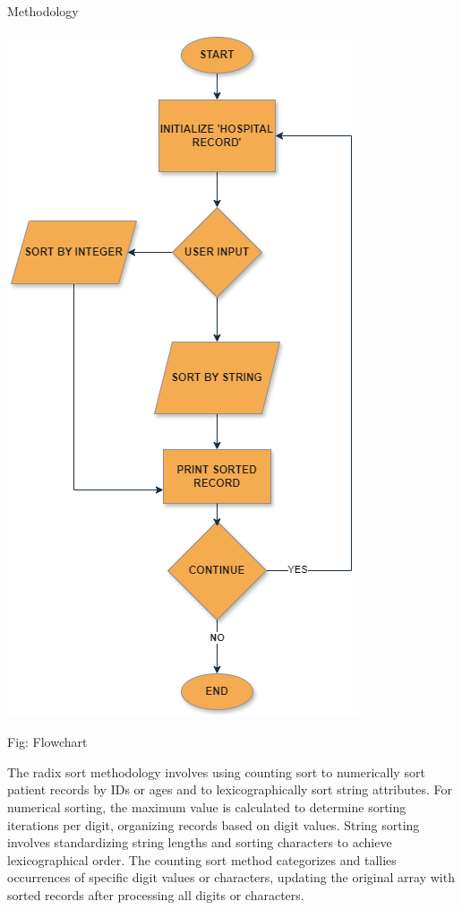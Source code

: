 \documentclass[final]{beamer}
\newlength{\colwidth}
\begin{document}
\begin{frame}[t]
\begin{columns}[t]
\begin{column}{\colwidth}
			\begin{alertblock}{Methodology}
   \begin{center}
       \includegraphics[]{Flow chart/CSE211 Project Hospital Record (radix sort) - flowchart.png}
       \addlinespace
       \caption{Fig: Flowchart }
   \end{center}
   The radix sort methodology involves using counting sort to numerically sort patient records by IDs or ages and to lexicographically sort string attributes. For numerical sorting, the maximum value is calculated to determine sorting iterations per digit, organizing records based on digit values. String sorting involves standardizing string lengths and sorting characters to achieve lexicographical order. The counting sort method categorizes and tallies occurrences of specific digit values or characters, updating the original array with sorted records after processing all digits or characters.
		\end{alertblock}
			

\end{column}
\end{columns}
\end{frame}
\end{document}
